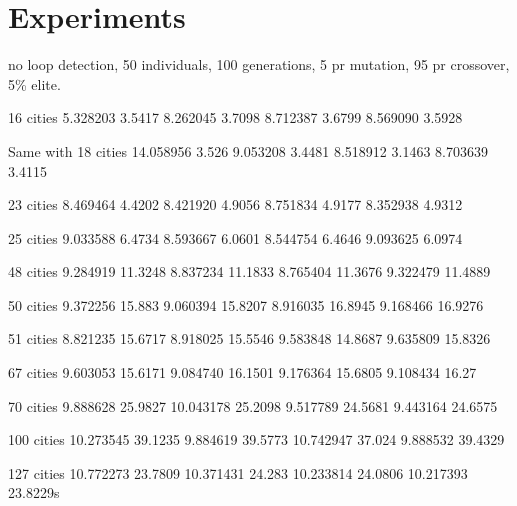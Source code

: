 \section{Experiments}


no loop detection, 50 individuals, 100 generations, 5 pr mutation, 95 pr crossover, 5\% elite.

16 cities
5.328203 3.5417
8.262045 3.7098
8.712387 3.6799
8.569090 3.5928

Same with 18 cities
14.058956 3.526
9.053208  3.4481
8.518912  3.1463
8.703639  3.4115

23 cities
8.469464  4.4202
8.421920  4.9056
8.751834  4.9177
8.352938  4.9312

25 cities
9.033588  6.4734
8.593667  6.0601
8.544754  6.4646
9.093625  6.0974

48 cities
9.284919  11.3248
8.837234  11.1833
8.765404  11.3676
9.322479  11.4889

50 cities
9.372256  15.883
9.060394  15.8207
8.916035  16.8945
9.168466  16.9276

51 cities
8.821235  15.6717
8.918025  15.5546
9.583848  14.8687
9.635809  15.8326

67 cities
9.603053  15.6171
9.084740  16.1501
9.176364  15.6805
9.108434  16.27

70 cities
9.888628  25.9827
10.043178 25.2098
9.517789  24.5681
9.443164  24.6575

100 cities
10.273545 39.1235
9.884619  39.5773
10.742947 37.024
9.888532  39.4329

127 cities
10.772273 23.7809
10.371431 24.283
10.233814 24.0806
10.217393 23.8229s